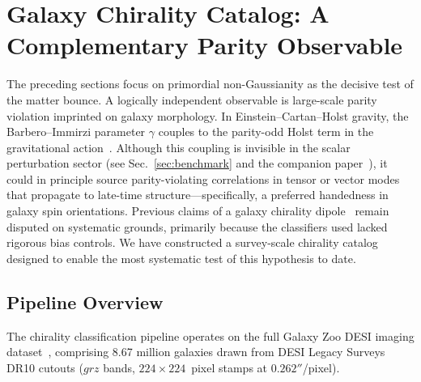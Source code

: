 %
%

\section{Galaxy Chirality Catalog: A Complementary Parity Observable}
\label{sec:chirality}

The preceding sections focus on primordial non-Gaussianity as the
decisive test of the matter bounce.  A logically independent observable
is large-scale parity violation imprinted on galaxy morphology.  In
Einstein--Cartan--Holst gravity, the Barbero--Immirzi parameter
$\gamma$ couples to the parity-odd Holst term in the gravitational
action~\citep{Holst:1995pc}.  Although this coupling is invisible in
the scalar perturbation sector (see Sec.~\ref{sec:benchmark} and the
companion paper~\citep{Golden:2026framework}), it could in principle
source parity-violating correlations in tensor or vector modes that
propagate to late-time structure---specifically, a preferred handedness
in galaxy spin orientations.  Previous claims of a galaxy chirality
dipole~\citep{Shamir:2012,Shamir:2020,Shamir:2022} remain disputed on
systematic grounds, primarily because the classifiers used lacked
rigorous bias controls.  We have constructed a survey-scale chirality
catalog designed to enable the most systematic test of this hypothesis
to date.

\subsection{Pipeline Overview}
\label{sec:chirality_pipeline}

The chirality classification pipeline operates on the full Galaxy Zoo
DESI imaging dataset~\citep{GalaxyZooDESI:2024}, comprising 8.67
million galaxies drawn from DESI Legacy Surveys DR10 cutouts ($grz$
bands, $224 \times 224$~pixel stamps at $0.262''$/pixel).

